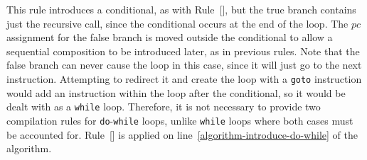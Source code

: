This rule introduces a conditional, as with
Rule~[], but the true branch
contains just the recursive call, since the conditional occurs at the
end of the loop.
The $pc$ assignment for the false branch is moved outside the
conditional to allow a sequential composition to be introduced later,
as in previous rules.
Note that the false branch can never cause the loop in this case,
since it will just go to the next instruction.
Attempting to redirect it and create the loop with a \texttt{goto}
instruction would add an instruction within the loop after the
conditional, so it would be dealt with as a \texttt{while} loop.
Therefore, it is not necessary to provide two compilation rules for
\texttt{do}-\texttt{while} loops, unlike \texttt{while} loops where
both cases must be accounted for.
Rule~[] is applied on
line~\ref{algorithm-introduce-do-while} of the algorithm.

